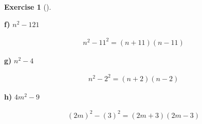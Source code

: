 \documentclass[
  letterpaper,
  DIV=11,
  numbers=noendperiod]{scrreprt}
\theoremstyle{definition}
\newtheorem{exercise}{Exercise}[chapter]
\theoremstyle{remark}
\begin{document}
\begin{exercise}[]
\begin{tcolorbox}
\textbf{f)} \(\displaystyle n^2 - 121\)

\begin{align*}
n^2 - 11^2 = (n + 11)(n - 11)
\end{align*}

\textbf{g)} \(\displaystyle n^2 - 4\)

\begin{align*}
n^2 - 2^2 = (n + 2)(n - 2)
\end{align*}

\textbf{h)} \(\displaystyle 4m^2 - 9\)

\begin{align*}
(2m)^2 - (3)^2 = (2m + 3)(2m - 3)
\end{align*}

\end{tcolorbox}

\end{exercise}
\end{document}
